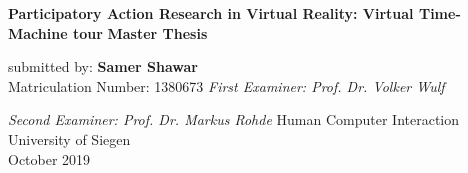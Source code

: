 \begin{titlepage}
    \begin{center}
        \vspace*{1cm}
        \Huge
        \textbf{Participatory Action Research in Virtual Reality: Virtual Time-Machine tour}
        \vfill
        \LARGE
        \textbf{Master Thesis}
        
        \vspace{0.5cm}
        submitted by:
        \vspace{1.5cm}
        \textbf{Samer Shawar}\\
        Matriculation Number: 1380673
        \vfill
        \textit {First Examiner: Prof. Dr. Volker Wulf}
        
        
        \textit {Second Examiner: Prof. Dr. Markus Rohde}
        \vfill
        \Large
        Human Computer Interaction\\
        University of Siegen\\
        October 2019\\
 \end{center}
\end{titlepage}